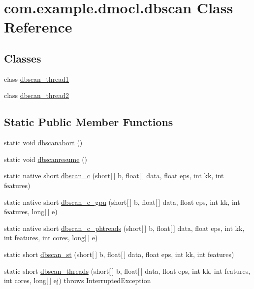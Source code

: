 \hypertarget{classcom_1_1example_1_1dmocl_1_1dbscan}{}\section{com.\+example.\+dmocl.\+dbscan Class Reference}
\label{classcom_1_1example_1_1dmocl_1_1dbscan}
\subsection*{Classes}
\begin{DoxyCompactItemize}
\item 
class \mbox{\hyperlink{classcom_1_1example_1_1dmocl_1_1dbscan_1_1dbscan__thread1}{dbscan\+\_\+thread1}}
\item 
class \mbox{\hyperlink{classcom_1_1example_1_1dmocl_1_1dbscan_1_1dbscan__thread2}{dbscan\+\_\+thread2}}
\end{DoxyCompactItemize}
\subsection*{Static Public Member Functions}
\begin{DoxyCompactItemize}
\item 
static void \mbox{\hyperlink{classcom_1_1example_1_1dmocl_1_1dbscan_ac0a5610d6eb5ea04f0ac297bf2fc9465}{dbscanabort}} ()
\item 
static void \mbox{\hyperlink{classcom_1_1example_1_1dmocl_1_1dbscan_ae930532d5261bca83fff8c032c57460e}{dbscanresume}} ()
\item 
static native short \mbox{\hyperlink{classcom_1_1example_1_1dmocl_1_1dbscan_abdf678cb2bc1751842e632910df91ef2}{dbscan\+\_\+c}} (short\mbox{[}$\,$\mbox{]} b, float\mbox{[}$\,$\mbox{]} data, float eps, int kk, int features)
\item 
static native short \mbox{\hyperlink{classcom_1_1example_1_1dmocl_1_1dbscan_aff87d111fa96f0cefa39304a0ac02dff}{dbscan\+\_\+c\+\_\+gpu}} (short\mbox{[}$\,$\mbox{]} b, float\mbox{[}$\,$\mbox{]} data, float eps, int kk, int features, long\mbox{[}$\,$\mbox{]} e)
\item 
static native short \mbox{\hyperlink{classcom_1_1example_1_1dmocl_1_1dbscan_ae91b2a29faf3f05081f4163e27cd571a}{dbscan\+\_\+c\+\_\+phtreads}} (short\mbox{[}$\,$\mbox{]} b, float\mbox{[}$\,$\mbox{]} data, float eps, int kk, int features, int cores, long\mbox{[}$\,$\mbox{]} e)
\item 
static short \mbox{\hyperlink{classcom_1_1example_1_1dmocl_1_1dbscan_ae775963e50e6c01388ab1b1d7e604f57}{dbscan\+\_\+st}} (short\mbox{[}$\,$\mbox{]} b, float\mbox{[}$\,$\mbox{]} data, float eps, int kk, int features)
\item 
static short \mbox{\hyperlink{classcom_1_1example_1_1dmocl_1_1dbscan_a966ad9839294c6c28b7e43f974592345}{dbscan\+\_\+threads}} (short\mbox{[}$\,$\mbox{]} b, float\mbox{[}$\,$\mbox{]} data, float eps, int kk, int features, int cores, long\mbox{[}$\,$\mbox{]} ej)  throws Interrupted\+Exception 
\end{DoxyCompactItemize}
